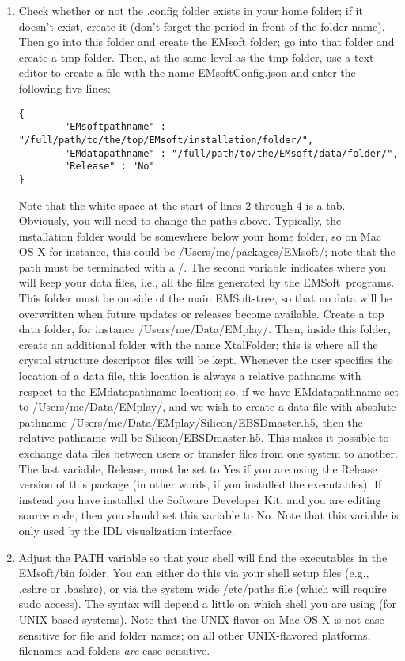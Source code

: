 \documentclass[DIV=calc, paper=letter, fontsize=11pt]{scrartcl}	 %
\newcommand{\ctp}{\textsf{EMSoft}}
\begin{document}
\begin{enumerate}
\item Check whether or not the \textsf{.config} folder exists in your home folder; if it doesn't exist, create it (don't forget the 
period in front of the folder name). Then go into this folder and create the \textsf{EMsoft} folder; go into
that folder and create a \textsf{tmp} folder.  Then, at the same level as the tmp folder, use a text editor to
create a file with the name \textsf{EMsoftConfig.json} and enter the following five lines:
\begin{verbatim}
{
        "EMsoftpathname" : "/full/path/to/the/top/EMsoft/installation/folder/",
        "EMdatapathname" : "/full/path/to/the/EMsoft/data/folder/",
        "Release" : "No" 
}
\end{verbatim}
Note that the white space at the start of lines 2 through 4 is a tab.  Obviously, you will need to change the paths above.
Typically, the installation folder would be somewhere below your home folder, so on Mac OS X for instance, this 
could be \textsf{/Users/me/packages/EMsoft/};  note that the path must be terminated with a \textsf{/}.
The second variable indicates where you will keep your data files, i.e., all the files generated by the \ctp\ programs.
This folder must be outside of the main \ctp-tree, so that no data will be overwritten when future updates or releases
become available.  Create a top data folder, for instance \textsf{/Users/me/Data/EMplay/}.  Then, inside this folder,
create an additional folder with the name \textsf{XtalFolder}; this is where all the crystal structure descriptor files 
will be kept.  Whenever the user specifies the location of a data file, this location is always a relative pathname
with respect to the \textsf{EMdatapathname} location;  so, if we have \textsf{EMdatapathname} set to \textsf{/Users/me/Data/EMplay/},
and we wish to create a data file with absolute pathname \textsf{/Users/me/Data/EMplay/Silicon/EBSDmaster.h5}, then
the relative pathname will be \textsf{Silicon/EBSDmaster.h5}.  This makes it possible to exchange data files 
between users or transfer files from one system to another.  The last variable, \textsf{Release}, must be set to \textsf{Yes} if you are 
using the Release version of this package (in other words, if you installed the executables).  If instead you have installed the 
Software Developer Kit, and you are editing source code, then you should set this variable to \textsf{No}.  Note that this variable is  
only used by the IDL visualization interface.

\item Adjust the PATH variable so that your shell will find the executables in the \textsf{EMsoft/bin} folder.  You can either do this via your shell setup files (e.g., \textsf{.cshrc}
or \textsf{.bashrc}), or via the system wide \textsf{/etc/paths} file (which will require \textsf{sudo} access).
The syntax will depend a little on which shell you are using (for UNIX-based systems).  Note that the UNIX flavor on Mac OS X 
is not case-sensitive for file and folder names; on all other UNIX-flavored platforms, filenames and folders \textit{are}
case-sensitive.


\end{enumerate}
\end{document}

